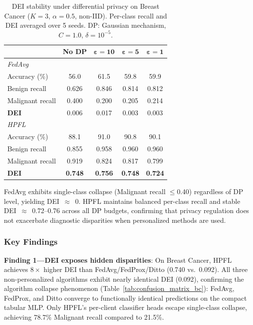 \documentclass[conference]{IEEEtran}
\begin{document}
\begin{table}[htbp]
\centering
\caption{DEI stability under differential privacy on Breast Cancer ($K{=}3$, $\alpha{=}0.5$, non-IID). Per-class recall and DEI averaged over 5 seeds. DP: Gaussian mechanism, $C{=}1.0$, $\delta{=}10^{-5}$.}
\label{tab:dei_dp}
\small
\begin{tabular}{lcccc}
\toprule
& \textbf{No DP} & $\boldsymbol{\varepsilon{=}10}$ & $\boldsymbol{\varepsilon{=}5}$ & $\boldsymbol{\varepsilon{=}1}$ \\
\midrule
\multicolumn{5}{l}{\textit{FedAvg}} \\
\quad Accuracy (\%) & 56.0 & 61.5 & 59.8 & 59.9 \\
\quad Benign recall & 0.626 & 0.846 & 0.814 & 0.812 \\
\quad Malignant recall & 0.400 & 0.200 & 0.205 & 0.214 \\
\quad \textbf{DEI} & 0.006 & 0.017 & 0.003 & 0.003 \\
\midrule
\multicolumn{5}{l}{\textit{HPFL}} \\
\quad Accuracy (\%) & 88.1 & 91.0 & 90.8 & 90.1 \\
\quad Benign recall & 0.855 & 0.958 & 0.960 & 0.960 \\
\quad Malignant recall & 0.919 & 0.824 & 0.817 & 0.799 \\
\quad \textbf{DEI} & \textbf{0.748} & \textbf{0.756} & \textbf{0.748} & \textbf{0.724} \\
\bottomrule
\end{tabular}

\vspace{1mm}
\footnotesize{FedAvg exhibits single-class collapse (Malignant recall $\leq$0.40) regardless of DP level, yielding DEI~$\approx$~0. HPFL maintains balanced per-class recall and stable DEI~$\approx$~0.72--0.76 across all DP budgets, confirming that privacy regulation does not exacerbate diagnostic disparities when personalized methods are used.}
\end{table}

\subsubsection{Key Findings}

\textbf{Finding 1---DEI exposes hidden disparities}: On Breast Cancer, HPFL achieves $8\times$ higher DEI than FedAvg/FedProx/Ditto (0.740 vs.\ 0.092). All three non-personalized algorithms exhibit nearly identical DEI (0.092), confirming the algorithm collapse phenomenon (Table~\ref{tab:confusion_matrix_bc}): FedAvg, FedProx, and Ditto converge to functionally identical predictions on the compact tabular MLP. Only HPFL's per-client classifier heads escape single-class collapse, achieving 78.7\% Malignant recall compared to 21.5\%.
\end{document}
